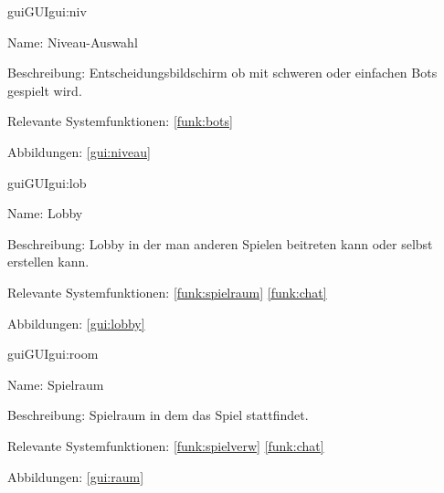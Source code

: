 \begin{description}[leftmargin=5em, style=sameline]	
	\begin{lhp}{gui}{GUI}{gui:niv}
		\item[Name:] Niveau-Auswahl
		\item[Beschreibung:] Entscheidungsbildschirm ob mit schweren oder einfachen Bots gespielt wird.
		\item[Relevante Systemfunktionen:] \ref{funk:bots}
		\item[Abbildungen:] \ref{gui:niveau}
	\end{lhp}
\end{description}

\begin{description}[leftmargin=5em, style=sameline]	
	\begin{lhp}{gui}{GUI}{gui:lob}
		\item[Name:] Lobby
		\item[Beschreibung:] Lobby in der man anderen Spielen beitreten kann oder selbst erstellen kann.
		\item[Relevante Systemfunktionen:] \ref{funk:spielraum} \ref{funk:chat}
		\item[Abbildungen:] \ref{gui:lobby}
	\end{lhp}
\end{description}

\begin{description}[leftmargin=5em, style=sameline]	
	\begin{lhp}{gui}{GUI}{gui:room}
		\item[Name:] Spielraum
		\item[Beschreibung:] Spielraum in dem das Spiel stattfindet.
		\item[Relevante Systemfunktionen:] \ref{funk:spielverw} \ref{funk:chat}
		\item[Abbildungen:] \ref{gui:raum}
	\end{lhp}
\end{description}


